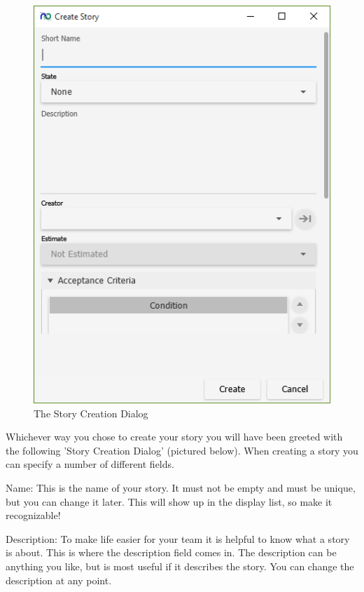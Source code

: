 \begin{figure}[H]
\centering
\includegraphics[width=\textwidth]{images/screenshots/stories2.PNG}
\caption{The Story Creation Dialog}
\label{fig:new_project}
\end{figure}

Whichever way you chose to create your story you will have been greeted with the following 'Story Creation Dialog' (pictured below). When creating a story you can specify a number of different fields. 

Name:
This is the name of your story. It must not be empty and must be unique, but you can change it later. This will show up in the display list, so make it recognizable!

Description:
To make life easier for your team it is helpful to know what a story is about. This is where the description field comes in. The description can be anything you like, but is most useful if it describes the story. You can change the description at any point.

